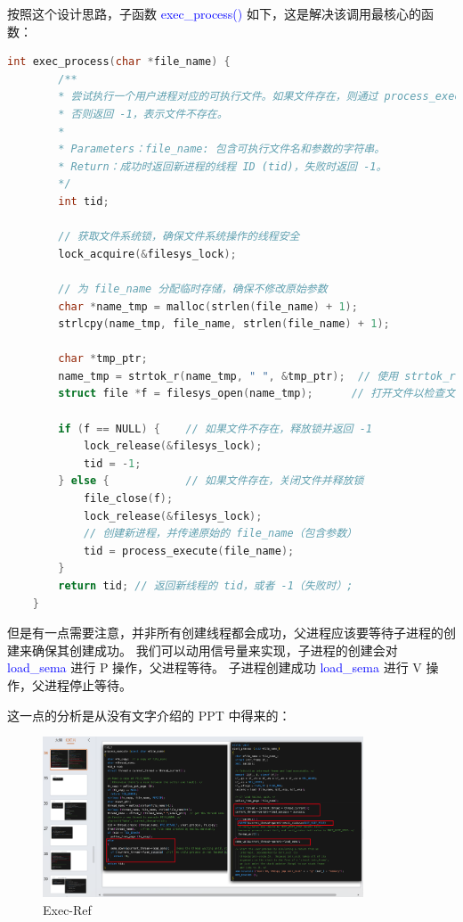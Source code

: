 \documentclass[14pt,a4paper,UTF8,twoside]{article}
\renewcommand{\texttt}[1]{\textcolor{blue}{\ttfamily #1}}
\begin{document}
按照这个设计思路，子函数 \texttt{exec\_process()} 如下，这是解决该调用最核心的函数：

\begin{lstlisting}[language=C, title= exec\_process()]
    int exec_process(char *file_name) {
        /**
        * 尝试执行一个用户进程对应的可执行文件。如果文件存在，则通过 process_execute() 创建并执行进程；
        * 否则返回 -1，表示文件不存在。
        *
        * Parameters：file_name: 包含可执行文件名和参数的字符串。
        * Return：成功时返回新进程的线程 ID (tid)，失败时返回 -1。
        */
        int tid;

        // 获取文件系统锁，确保文件系统操作的线程安全
        lock_acquire(&filesys_lock);
    
        // 为 file_name 分配临时存储，确保不修改原始参数
        char *name_tmp = malloc(strlen(file_name) + 1);
        strlcpy(name_tmp, file_name, strlen(file_name) + 1);
    
        char *tmp_ptr;
        name_tmp = strtok_r(name_tmp, " ", &tmp_ptr);  // 使用 strtok_r 提取文件名（忽略参数部分）
        struct file *f = filesys_open(name_tmp);      // 打开文件以检查文件是否存在
        
        if (f == NULL) {    // 如果文件不存在，释放锁并返回 -1
            lock_release(&filesys_lock);
            tid = -1;
        } else {            // 如果文件存在，关闭文件并释放锁
            file_close(f);
            lock_release(&filesys_lock);
            // 创建新进程，并传递原始的 file_name（包含参数）
            tid = process_execute(file_name);
        }    
        return tid; // 返回新线程的 tid，或者 -1（失败时）;
    }
\end{lstlisting}

但是有一点需要注意，并非所有创建线程都会成功，父进程应该要等待子进程的创建来确保其创建成功。
我们可以动用信号量来实现，子进程的创建会对 \texttt{load\_sema} 进行 P 操作，父进程等待。
子进程创建成功 \texttt{load\_sema} 进行 V 操作，父进程停止等待。

这一点的分析是从没有文字介绍的 PPT 中得来的：

\begin{figure}[H]
    \centering
    \includegraphics[width=0.85\textwidth]{img6/ale.png}
    \caption{Exec-Ref}
    \label{fig:wait}
\end{figure}
\end{document}
